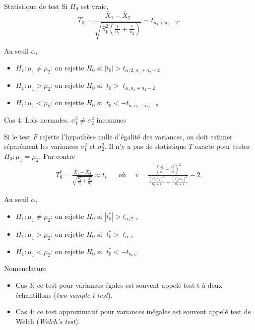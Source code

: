 \documentclass{BeamerTemplate}
\begin{document}
\begin{frame}[t]{Statistique de test}
Si $H_0$ est vraie,
$$
T_0 = \frac{\overline{X}_1 - \overline{X}_2}{\sqrt{S_p^2 \left( \frac{1}{n_1} + \frac{1}{n_2} \right)} } \sim t_{n_1 + n_2 -2}.
$$

Au seuil $\alpha$,

\begin{itemize}\itemsep2mm
\item $H_1 : \mu_1 \ne \mu_2$: on rejette $H_0$ si $\left| t_0  \right|  > t_{\alpha/2, n_1+n_2-2}$
\item $H_1 : \mu_1 > \mu_2$: on rejette $H_0$ si $\;t_0   > \;t_{\alpha, n_1+n_2-2}$
\item $H_1 : \mu_1 < \mu_2$: on rejette $H_0$ si $\;t_0   < - t_{\alpha,n_1+n_2-2}$
\end{itemize}

\end{frame}

\begin{frame}[t]{Cas 4: Lois normales, $\sigma^2_1 \ne \sigma^2_2$ inconnues}

{\small 
Si le test $F$ \alert{rejette l'hypothèse nulle d'égalité des variances}, on doit estimer \alert{séparément} les variances $\sigma^2_1$ et $\sigma_2^2$.
Il n'y a pas de statistique $T$ exacte pour tester $H_0 : \mu_1 = \mu_2$.
Par contre
\begin{align*}
T_0^* = \frac{\overline{X}_1 - \overline{X}_2}{ \sqrt{ \frac{S^2_1}{n_1} + \frac{S^2_2}{n_2}  }} \approx t_v  & &
\mbox{o\`u }\quad v = \frac{\left( \frac{s_1^2}{n_1} + \frac{s_2^2}{n_2} \right) ^2 }{ \frac{ (s_1^2 / n_1)^2}{n_1 + 1} + \frac{ (s_2^2 / n_2)^2}{n_2 + 1}} - 2.
\end{align*}

\medskip
Au seuil $\alpha$,

\begin{itemize}\itemsep2mm
\item $H_1 : \mu_1 \ne \mu_2$: on rejette $H_0$ si $\left| t_0^*  \right|  > t_{\alpha/2, v}$
\item $H_1 : \mu_1 > \mu_2$: on rejette $H_0$ si $\;t_0^*   > \;t_{\alpha,v}$
\item $H_1 : \mu_1 < \mu_2$: on rejette $H_0$ si $\;t_0^*   < - t_{\alpha,v}$
\end{itemize}
}
\end{frame}

\begin{frame}[t]{Nomenclature}

\begin{itemize}\itemsep1cm
\item Cas 3: ce test pour variances égales est souvent appelé \alert{test-t à deux échantillons} ({\it two-sample t-test}).
\item Cas 4: ce test approximatif pour variances inégales est souvent appelé \alert{test de Welch} ({\it Welch's test}).
\end{itemize}

\end{frame}
\end{document}
